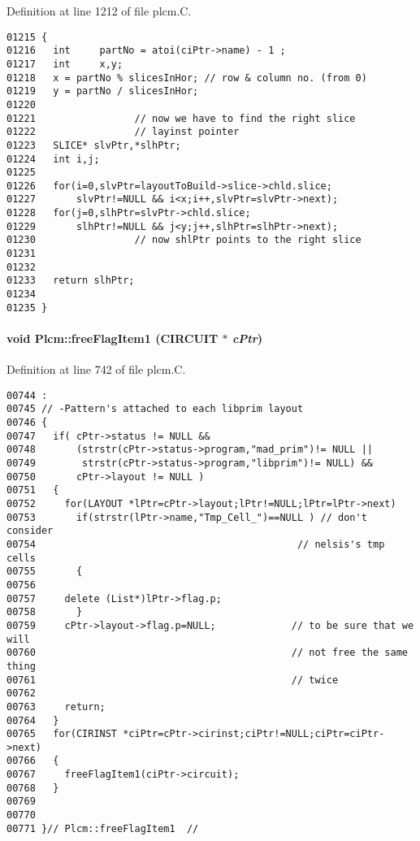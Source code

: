 Definition at line 1212 of file plcm.C.\small\begin{verbatim}01215 {
01216   int     partNo = atoi(ciPtr->name) - 1 ;
01217   int     x,y;
01218   x = partNo % slicesInHor; // row & column no. (from 0)
01219   y = partNo / slicesInHor;
01220     
01221                 // now we have to find the right slice
01222                 // layinst pointer
01223   SLICE* slvPtr,*slhPtr;
01224   int i,j;
01225   
01226   for(i=0,slvPtr=layoutToBuild->slice->chld.slice;
01227       slvPtr!=NULL && i<x;i++,slvPtr=slvPtr->next);
01228   for(j=0,slhPtr=slvPtr->chld.slice;
01229       slhPtr!=NULL && j<y;j++,slhPtr=slhPtr->next);
01230                 // now shlPtr points to the right slice
01231     
01232     
01233   return slhPtr;
01234 
01235 }
\end{verbatim}\normalsize 
\label{Plcm_c6}
\paragraph{\setlength{\rightskip}{0pt plus 5cm}void Plcm::free\-Flag\-Item1 (CIRCUIT $\ast$ {\em c\-Ptr})\hspace{0.3cm}{\tt  [private]}}\hfill



Definition at line 742 of file plcm.C.\small\begin{verbatim}00744 :
00745 // -Pattern's attached to each libprim layout
00746 {
00747   if( cPtr->status != NULL &&
00748       (strstr(cPtr->status->program,"mad_prim")!= NULL ||
00749        strstr(cPtr->status->program,"libprim")!= NULL) &&
00750       cPtr->layout != NULL )
00751   {
00752     for(LAYOUT *lPtr=cPtr->layout;lPtr!=NULL;lPtr=lPtr->next)
00753       if(strstr(lPtr->name,"Tmp_Cell_")==NULL ) // don't consider 
00754                                             // nelsis's tmp cells
00755       {
00756 
00757     delete (List*)lPtr->flag.p;
00758       }
00759     cPtr->layout->flag.p=NULL;             // to be sure that we will
00760                                            // not free the same thing
00761                                            // twice
00762 
00763     return;
00764   }
00765   for(CIRINST *ciPtr=cPtr->cirinst;ciPtr!=NULL;ciPtr=ciPtr->next)
00766   {
00767     freeFlagItem1(ciPtr->circuit);
00768   }
00769 
00770 
00771 }// Plcm::freeFlagItem1  //

\end{verbatim}\normalsize 
\label{Plcm_c7}

